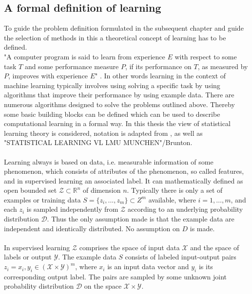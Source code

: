 \subsection{A formal definition of learning}
To guide the problem definition formulated in the subsequent chapter and guide the selection of methods in this a theoretical concept of learning has to be defined.\\ %
"A computer program is said to learn from experience $E$ with respect to some task $T$ and some performance measure $P$, if its performance on $T$, as measured by $P$, improves with experience $E$" \cite{Mitchell1997}. In other words learning in the context of machine learning typically involves using solving a specific task by using algorithms that improve their performance by using example data. There are numerous algorithms designed to solve the problems outlined above. Thereby some basic building blocks can be defined which can be used to describe computational learning in a formal way. In this thesis the view of statistical learning theory is considered, notation is adapted from \citeauthor{Shalev2014}\cite{Shalev2014}, \citeauthor{Von_luxburg2011}\cite{Von_luxburg2011} as well as "STATISTICAL LEARNING VL LMU MUNCHEN"/Brunton.\\
\\
Learning always is based on data, i.e. measurable information of some phenomenon, which consists of attributes of the phenomenon, so called features, and in supervised learning an associated label. It can mathematically defined as open bounded set $\mathcal{Z}\subset\mathbb{R}^n$ of dimension $n$. Typically there is only a set of examples or training data $S=\{z_i,...,z_m\}\subset{Z}^m$ available, where $i = 1,\dots,m$, and each $z_i$ is sampled independently from $\mathcal{Z}$ according to an underlying probability distribution $\mathcal{D}$. Thus the only assumption made is that the example data are independent and identically distributed. No assumption on $D$ is made.\\
\\
In supervised learning $\mathcal{Z}$ comprises the space of input data $\mathcal{X}$ and the space of labels or output $\mathcal{Y}$. The example data $S$ consists of labeled input-output pairs $z_i=x_i,y_i\in(\mathcal{X}\times\mathcal{Y})^m$, where $x_i$ is an input data vector and $y_i$ is its corresponding output label. The pairs are sampled by some unknown joint probability distribution $\mathcal{D}$ on the space $\mathcal{X}\times\mathcal{Y}$.\\
